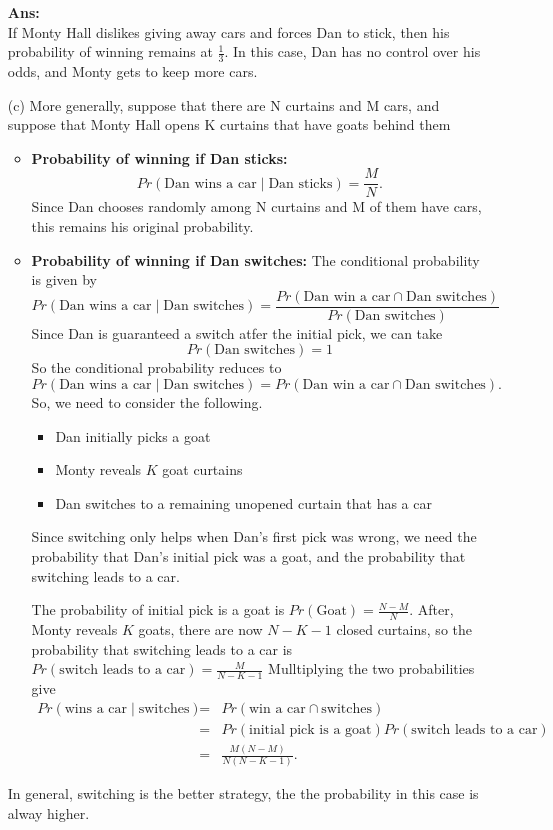 \documentclass[12pt]{ut-thesis}
\theoremstyle{definition}
\begin{document}
\begin{itemize}
		\textbf{Ans:}\\
		If Monty Hall dislikes giving away cars and forces Dan to stick, 
		then his probability of winning remains at $\frac{1}{3}$.
		In this case, Dan has no control over his odds, and Monty gets to keep more cars.
		
		\item[(c)] More generally, suppose that there are N curtains and M cars, and suppose 
		that Monty Hall opens K curtains that have goats behind them
		\begin{itemize}
			\item \textbf{Probability of winning if Dan sticks:} 
			\[ Pr(\text{Dan wins a car}\; |\; \text{Dan sticks}) = \frac{M}{N}.\] 
			Since Dan chooses randomly among N curtains and M of them have cars, 
			this remains his original probability.
			\item \textbf{Probability of winning if Dan switches:}
			The conditional probability is given by
			\[ Pr(\text{Dan wins a car}\; |\; \text{Dan switches}) = \frac{Pr(\text{Dan win a car} \cap \text{Dan switches})}{Pr(\text{Dan switches})} \]
			Since Dan is guaranteed a switch atfer the initial pick, we can take $$Pr(\text{Dan switches}) = 1$$
			So the conditional probability reduces to 
			\[ Pr(\text{Dan wins a car}\; |\; \text{Dan switches}) = Pr(\text{Dan win a car} \cap \text{Dan switches}).\] So, we need to consider
			the following.
			\begin{itemize}
				\item Dan initially picks a goat
				\item Monty reveals $K$ goat curtains
				\item Dan switches to a remaining unopened curtain that has a car
			\end{itemize}
			Since switching only helps when Dan's first pick was wrong, 
			we need the probability that Dan's initial pick was a goat, and 
			the probability that switching leads to a car.

			The probability of initial pick is a goat is $Pr(\text{Goat}) = \frac{N-M}{N}$. After, 
			Monty reveals $K$ goats, there are now $N-K-1$ closed curtains, 
			so the probability that switching leads to a car is $Pr(\text{switch leads to a car}) = \frac{M}{N-K-1}$
			Mulltiplying the two probabilities give
			\begin{eqnarray*}
				Pr(\text{wins a car} \;|\; \text{switches})&=&Pr(\text{win a car} \cap \text{switches})\\
				&=& Pr(\text{initial pick is a goat})Pr(\text{switch leads to a car})\\
				&=& \frac{M(N-M)}{N(N-K-1)}.
			\end{eqnarray*}
		\end{itemize}
		In general, switching is the better strategy, the the probability in this case is alway higher.
	\end{itemize}
\end{document}
